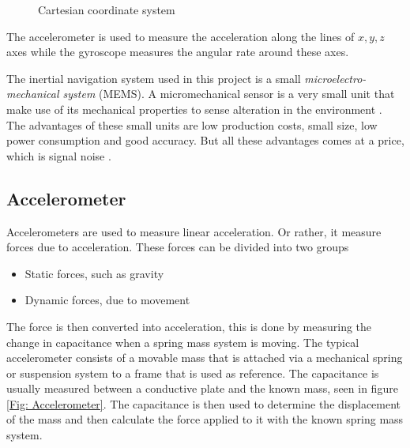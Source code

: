 \documentclass[a4paper,11pt]{kth-mag}
\begin{document}
\begin{figure}[!hbt] 
\centering
{}
%
%

\caption{Cartesian coordinate system}
\label{Figure: cartesian}
\end{figure}
 
The accelerometer is used to measure the acceleration along the lines of $x,y,z$ axes while the gyroscope measures the angular rate around these axes.
 
The inertial navigation system used in this project is a small \textit{microelectro-mechanical system} (MEMS). A micromechanical sensor is a very small unit that make use of its mechanical properties to sense alteration in the environment \cite{ref:accelerometero}. The advantages of these small units are low production costs, small size, low power consumption and good accuracy. But all these advantages comes at a price, which is signal noise \cite{IMUintro}.
\subsection{Accelerometer} \label{sec: accelerometer}
Accelerometers are used to measure linear acceleration. Or rather, it measure forces due to acceleration. These forces can be divided into two groups
\begin{itemize}
\item Static forces, such as gravity
\item Dynamic forces, due to movement
\end{itemize}
The force is then converted into acceleration, this is done by measuring the change in capacitance when a spring mass system is moving. The typical accelerometer consists of a movable mass that is attached via a mechanical spring or suspension system to a frame that is used as reference. 
The capacitance is usually measured between a conductive plate and the known mass, seen in figure \ref{Fig: Accelerometer}. The capacitance is then used to determine the displacement of the mass and then calculate the force applied to it with the known spring mass system.
\end{document}
